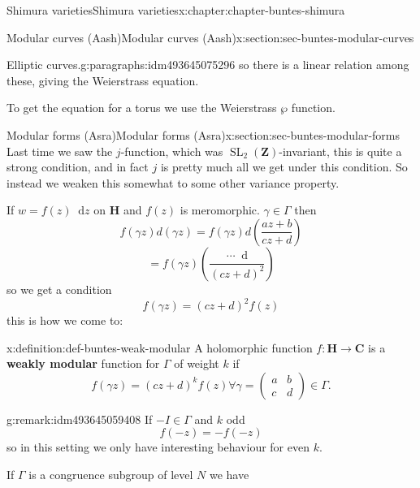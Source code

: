 \documentclass[oneside,10pt,]{book}
\newcommand{\terminology}[1]{\textbf{#1}}
\numberwithin{equation}{section}
\newcommand{\diff}{\mathop{}\!\mathrm{d}}
\newcommand{\ZZ}{\mathbf{Z}}
\newcommand{\CC}{\mathbf{C}}
\newcommand{\HH}{\mathbf{H}}
\DeclareMathOperator{\SL}{SL}
\newcommand{\amp}{&}
\begin{document}
\begin{chapterptx}{Shimura varieties}{}{Shimura varieties}{}{}{x:chapter:chapter-buntes-shimura}
\begin{sectionptx}{Modular curves (Aash)}{}{Modular curves (Aash)}{}{}{x:section:sec-buntes-modular-curves}
\begin{paragraphs}{Elliptic curves.}{g:paragraphs:idm493645075296}
so there is a linear relation among these, giving the Weierstrass equation.%
\par
To get the equation for a torus we use the Weierstrass \(\wp\) function.%
\end{paragraphs}%
\end{sectionptx}
%
%
\typeout{************************************************}
\typeout{************************************************}
%
\begin{sectionptx}{Modular forms (Asra)}{}{Modular forms (Asra)}{}{}{x:section:sec-buntes-modular-forms}
Last time we saw the \(j\)-function, which was \(\SL_2(\ZZ)\)-invariant, this is quite a strong condition, and in fact \(j\) is pretty much all we get under this condition. So instead we weaken this somewhat to some other variance property.%
\par
If \(w = f(z) \diff z\) on \(\HH\) and \(f(z)\) is meromorphic. \(\gamma \in \Gamma\) then%
\begin{equation*}
f(\gamma z) d(\gamma z) = f(\gamma z) d\left( \frac{az+b}{cz+d} \right)
\end{equation*}
%
\begin{equation*}
= f(\gamma z) \left( \frac{\cdots \diff }{(cz+d)^2} \right)
\end{equation*}
so we get a condition%
\begin{equation*}
f(\gamma z) = (cz+d)^2 f(z)
\end{equation*}
this is how we come to:%
\begin{definition}{}{x:definition:def-buntes-weak-modular}%
A holomorphic function \(f\colon \HH \to \CC\) is a \terminology{weakly modular} function for \(\Gamma\) of weight \(k\) if%
\begin{equation*}
f(\gamma z) = (cz+d)^k f(z) \forall \gamma  = \begin{pmatrix} a\amp b \\ c \amp d    \end{pmatrix} \in \Gamma\text{.}
\end{equation*}
%
\end{definition}
\begin{remark}{}{g:remark:idm493645059408}%
If \(-I \in \Gamma\) and \(k\) odd%
\begin{equation*}
f(-z)  = - f(-z)
\end{equation*}
so in this setting we only have interesting behaviour for even \(k\).%
\par
If \(\Gamma\) is a congruence subgroup of level \(N\) we have%

\end{remark}
\end{sectionptx}
\end{chapterptx}
\end{document}
